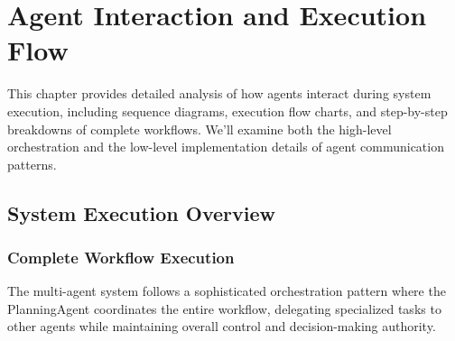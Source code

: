 \chapter{Agent Interaction and Execution Flow}

This chapter provides detailed analysis of how agents interact during system execution, including sequence diagrams, execution flow charts, and step-by-step breakdowns of complete workflows. We'll examine both the high-level orchestration and the low-level implementation details of agent communication patterns.

\section{System Execution Overview}

\subsection{Complete Workflow Execution}

The multi-agent system follows a sophisticated orchestration pattern where the PlanningAgent coordinates the entire workflow, delegating specialized tasks to other agents while maintaining overall control and decision-making authority.

